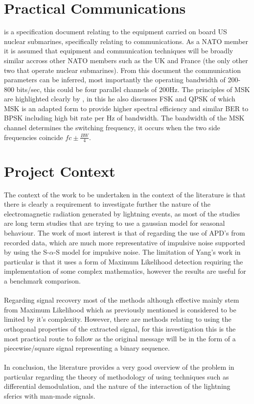 \section{Practical Communications}
\cite{appendixA} is a specification document relating to the equipment carried on board US nuclear submarines, specifically relating to communications. As a NATO member it is assumed that equipment and communication techniques will be broadly similar accross other NATO members such as the UK and France (the only other two that operate nuclear submarines). From this document the communication parameters can be inferred, most importantly the operating bandwidth of 200-800 bits/sec, this could be four parallel channels of 200Hz. The principles of MSK are highlighted clearly by \cite{Pasupathy1979}, in this he also discusses FSK and QPSK of which MSK is an adapted form to provide higher spectral efficiency and similar BER to BPSK including high bit rate per Hz of bandwidth. 
The bandwidth of the MSK channel determines the switching frequency, it occurs when the two side frequencies coincide $fc\pm\frac{BW}{4}$.

\section{Project Context}
The context of the work to be undertaken in the context of the literature is that there is clearly a requirement to investigate further the nature of the electromagnetic radiation generated by lightning events, as most of the studies are long term studies that are trying to use a gaussian model for seasonal behaviour. The work of most interest is that of \cite{Chrissan2000} regarding the use of APD's from recorded data, which are much more representative of impulsive noise supported by \cite{Yang2016} using the S-$\alpha$-S model for impulsive noise. The limitation of Yang's work in particular is that it uses a form of Maximum Likelihood detection requiring the implementation of some complex mathematics, however the results are useful for a benchmark comparison. 
\\\\
Regarding signal recovery most of the methods although effective mainly stem from Maximum Likelihood which as previously mentioned is considered to be limited by it's complexity. However, there are methods relating to using the orthogonal properties of the extracted signal, for this investigation this is the most practical route to follow as the original message will be in the form of a piecewise/square signal representing a binary sequence.
\\\\
In conclusion, the literature provides a very good overview of the problem in particular regarding the theory of methodology of using techniques such as differential demodulation, and the nature of the interaction of the lightning sferics with man-made signals.